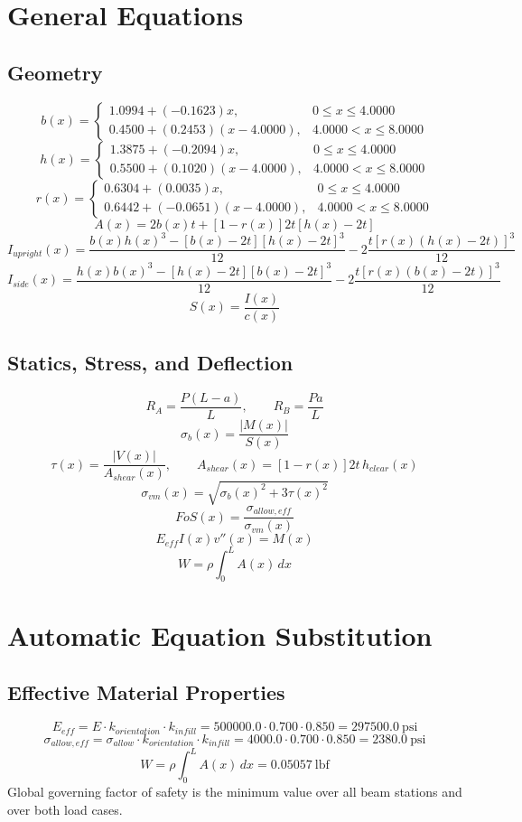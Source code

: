 \documentclass[11pt]{article}
\begin{document}
\section*{General Equations}
\subsection*{Geometry}
\[
b(x)=\begin{cases}1.0994 + (-0.1623)x, & 0 \le x \le 4.0000\\0.4500 + (0.2453)(x-4.0000), & 4.0000 < x \le 8.0000\end{cases}
\]
\[
h(x)=\begin{cases}1.3875 + (-0.2094)x, & 0 \le x \le 4.0000\\0.5500 + (0.1020)(x-4.0000), & 4.0000 < x \le 8.0000\end{cases}
\]
\[
r(x)=\begin{cases}0.6304 + (0.0035)x, & 0 \le x \le 4.0000\\0.6442 + (-0.0651)(x-4.0000), & 4.0000 < x \le 8.0000\end{cases}
\]
\[
A(x)=2b(x)t+[1-r(x)]2t[h(x)-2t]
\]
\[
I_{upright}(x)=\frac{b(x)h(x)^3-[b(x)-2t][h(x)-2t]^3}{12}-2\frac{t[r(x)(h(x)-2t)]^3}{12}
\]
\[
I_{side}(x)=\frac{h(x)b(x)^3-[h(x)-2t][b(x)-2t]^3}{12}-2\frac{t[r(x)(b(x)-2t)]^3}{12}
\]
\[
S(x)=\frac{I(x)}{c(x)}
\]

\subsection*{Statics, Stress, and Deflection}
\[
R_A=\frac{P(L-a)}{L}, \qquad R_B=\frac{Pa}{L}
\]
\[
\sigma_b(x)=\frac{|M(x)|}{S(x)}
\]
\[
\tau(x)=\frac{|V(x)|}{A_{shear}(x)}, \qquad A_{shear}(x)=[1-r(x)]2t\,h_{clear}(x)
\]
\[
\sigma_{vm}(x)=\sqrt{\sigma_b(x)^2+3\tau(x)^2}
\]
\[
FoS(x)=\frac{\sigma_{allow,eff}}{\sigma_{vm}(x)}
\]
\[
E_{eff}I(x)v''(x)=M(x)
\]
\[
W=\rho\int_0^L A(x)\,dx
\]

\section*{Automatic Equation Substitution}
\subsection*{Effective Material Properties}
\[E_{eff} = E \cdot k_{orientation} \cdot k_{infill} = 500000.0 \cdot 0.700 \cdot 0.850 = 297500.0\ \mathrm{psi}\]
\[\sigma_{allow,eff} = \sigma_{allow} \cdot k_{orientation} \cdot k_{infill} = 4000.0 \cdot 0.700 \cdot 0.850 = 2380.0\ \mathrm{psi}\]
\[W = \rho \int_0^L A(x)\,dx = 0.05057\ \mathrm{lbf}\]
Global governing factor of safety is the minimum value over all beam stations and over both load cases.
\end{document}
